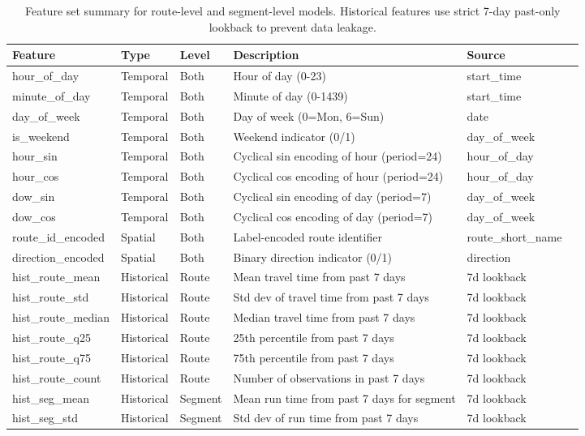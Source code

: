 \begin{table}
\caption{Feature set summary for route-level and segment-level models. Historical features use strict 7-day past-only lookback to prevent data leakage.}
\label{tab:feature_summary}
\begin{tabular}{llllp{5cm}l}
\toprule
Feature & Type & Level & Description & Source \\
\midrule
hour_of_day & Temporal & Both & Hour of day (0-23) & start_time \\
minute_of_day & Temporal & Both & Minute of day (0-1439) & start_time \\
day_of_week & Temporal & Both & Day of week (0=Mon, 6=Sun) & date \\
is_weekend & Temporal & Both & Weekend indicator (0/1) & day_of_week \\
hour_sin & Temporal & Both & Cyclical sin encoding of hour (period=24) & hour_of_day \\
hour_cos & Temporal & Both & Cyclical cos encoding of hour (period=24) & hour_of_day \\
dow_sin & Temporal & Both & Cyclical sin encoding of day (period=7) & day_of_week \\
dow_cos & Temporal & Both & Cyclical cos encoding of day (period=7) & day_of_week \\
route_id_encoded & Spatial & Both & Label-encoded route identifier & route_short_name \\
direction_encoded & Spatial & Both & Binary direction indicator (0/1) & direction \\
hist_route_mean & Historical & Route & Mean travel time from past 7 days & 7d lookback \\
hist_route_std & Historical & Route & Std dev of travel time from past 7 days & 7d lookback \\
hist_route_median & Historical & Route & Median travel time from past 7 days & 7d lookback \\
hist_route_q25 & Historical & Route & 25th percentile from past 7 days & 7d lookback \\
hist_route_q75 & Historical & Route & 75th percentile from past 7 days & 7d lookback \\
hist_route_count & Historical & Route & Number of observations in past 7 days & 7d lookback \\
hist_seg_mean & Historical & Segment & Mean run time from past 7 days for segment & 7d lookback \\
hist_seg_std & Historical & Segment & Std dev of run time from past 7 days & 7d lookback \\

\end{tabular}
\end{table}
